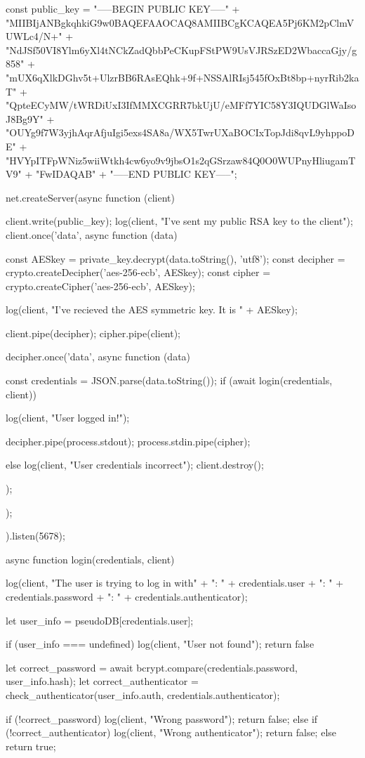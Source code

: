 \begin{js}
const public_key = "-----BEGIN PUBLIC KEY-----\n" +
    "MIIBIjANBgkqhkiG9w0BAQEFAAOCAQ8AMIIBCgKCAQEA5Pj6KM2pClmVUWLc4/N+\n" +
    "NdJSf50VI8Ylm6yXl4tNCkZadQbbPeCKupFStPW9UsVJRSzED2WbaccaGjy/g858\n" +
    "mUX6qXlkDGhv5t+UlzrBB6RAsEQhk+9f+NSSAlRIsj545fOxBt8bp+nyrRib2kaT\n" +
    "QpteECyMW/tWRDiUxI3IfMMXCGRR7bkUjU/eMFf7YIC58Y3IQUDGlWaIsoJ8Bg9Y\n" +
    "OUYg9f7W3yjhAqrAfjuIgi5exs4SA8a/WX5TwrUXaBOCIxTopJdi8qvL9yhppoDE\n" +
    "HVYpITFpWNiz5wiiWtkh4cw6yo9v9jbsO1s2qGSrzaw84Q0O0WUPnyHliugamTV9\n" +
    "FwIDAQAB\n" +
    "-----END PUBLIC KEY-----";

net.createServer(async function (client) {
    client.write(public_key);
    log(client, "I've sent my public RSA key to the client");
    client.once('data', async function (data) {
        const AESkey = private_key.decrypt(data.toString(), 'utf8');
        const decipher = crypto.createDecipher('aes-256-ecb', AESkey);
        const cipher = crypto.createCipher('aes-256-ecb', AESkey);

        log(client, "I've recieved the AES symmetric key. It is " + AESkey);

        client.pipe(decipher);
        cipher.pipe(client);

        decipher.once('data', async function (data) {
            const credentials = JSON.parse(data.toString());
            if (await login(credentials, client)) {
                log(client, "User logged in!");

                decipher.pipe(process.stdout);
                process.stdin.pipe(cipher);

            } else {
                log(client, "User credentials incorrect");
                client.destroy();
            }
        });
    });
}).listen(5678);


async function login(credentials, client) {
    log(client, "The user is trying to log in with" +
        "\n\tUser: " + credentials.user +
        "\n\tPassword: " + credentials.password +
        "\n\tAuthenticator: " + credentials.authenticator);

    let user_info = pseudoDB[credentials.user];

    if (user_info === undefined) {
        log(client, "User not found");
        return false
    }

    let correct_password = await bcrypt.compare(credentials.password, user_info.hash);
    let correct_authenticator = check_authenticator(user_info.auth, credentials.authenticator);

    if (!correct_password) {
        log(client, "Wrong password");
        return false;
    } else if (!correct_authenticator) {
        log(client, "Wrong authenticator");
        return false;
    } else {
        return true;
    }
}


\end{js}
